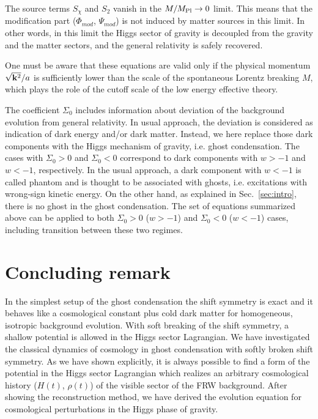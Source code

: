 The source terms $S_{\chi}$ and $S_2$ vanish in the $M/M_{\rm Pl}\to 0$
limit. This means that the modification part ($\Phi_{mod}$,
$\Psi_{mod}$) is not induced by matter sources in this limit. In other
words, in this limit the Higgs sector of gravity is decoupled from the
gravity and the matter sectors, and the general relativity is safely
recovered. 


One must be aware that these equations are valid only if the physical
momentum $\sqrt{{\bf k}^2}/a$ is sufficiently lower than the scale of
the spontaneous Lorentz breaking $M$, which plays the role of the cutoff
scale of the low energy effective theory. 


The coefficient $\Sigma_0$ includes information about deviation of the
background evolution from general relativity. In usual approach, the
deviation is considered as indication of dark energy and/or dark
matter. Instead, we here replace those dark components with the Higgs
mechanism of gravity, i.e. ghost condensation. The cases with
$\Sigma_0>0$ and $\Sigma_0<0$ correspond to dark components with 
$w>-1$ and $w<-1$, respectively. In the usual approach, a dark component
with $w<-1$ is called phantom and is thought to be associated with
ghosts, i.e. excitations with wrong-sign kinetic energy. On the other
hand, as explained in Sec.~\ref{sec:intro}, there is no ghost in the
ghost condensation. The set of equations summarized above can be applied
to both $\Sigma_0>0$ ($w>-1$) and $\Sigma_0<0$ ($w<-1$) cases, including
transition between these two regimes. 










\section{Concluding remark}


In the simplest setup of the ghost condensation the shift symmetry is
exact and it behaves like a cosmological constant plus cold dark matter
for homogeneous, isotropic background evolution. With soft breaking of
the shift symmetry, a shallow potential is allowed in the Higgs sector
Lagrangian. We have investigated the classical dynamics of cosmology in
ghost condensation with softly broken shift symmetry. As we have shown
explicitly, it is always possible to find a form of the potential in the
Higgs sector Lagrangian which realizes an arbitrary cosmological history
($H(t)$, $\rho(t)$) of the visible sector of the FRW background. After
showing the reconstruction method, we have derived the evolution
equation for cosmological perturbations in the Higgs phase of gravity. 



